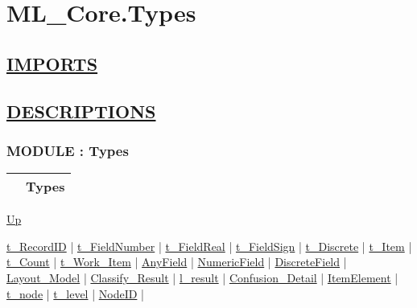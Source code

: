 \chapter*{ML\_Core.Types}
\hypertarget{ecldoc:toc:ML_Core.Types}{}

\section*{\underline{IMPORTS}}

\section*{\underline{DESCRIPTIONS}}
\subsection*{MODULE : Types}
\hypertarget{ecldoc:ML_Core.Types}{}

{\renewcommand{\arraystretch}{1.5}
\begin{tabularx}{\textwidth}{|>{\raggedright\arraybackslash}l|X|}
\hline
\hspace{0pt} & Types \\
\hline
\end{tabularx}
}

\hyperlink{ecldoc:toc:ML_Core}{Up}

\par


\hyperlink{ecldoc:ml_core.types.t_recordid}{t\_RecordID}  |
\hyperlink{ecldoc:ml_core.types.t_fieldnumber}{t\_FieldNumber}  |
\hyperlink{ecldoc:ml_core.types.t_fieldreal}{t\_FieldReal}  |
\hyperlink{ecldoc:ml_core.types.t_fieldsign}{t\_FieldSign}  |
\hyperlink{ecldoc:ml_core.types.t_discrete}{t\_Discrete}  |
\hyperlink{ecldoc:ml_core.types.t_item}{t\_Item}  |
\hyperlink{ecldoc:ml_core.types.t_count}{t\_Count}  |
\hyperlink{ecldoc:ml_core.types.t_work_item}{t\_Work\_Item}  |
\hyperlink{ecldoc:ml_core.types.anyfield}{AnyField}  |
\hyperlink{ecldoc:ml_core.types.numericfield}{NumericField}  |
\hyperlink{ecldoc:ml_core.types.discretefield}{DiscreteField}  |
\hyperlink{ecldoc:ml_core.types.layout_model}{Layout\_Model}  |
\hyperlink{ecldoc:ml_core.types.classify_result}{Classify\_Result}  |
\hyperlink{ecldoc:ml_core.types.l_result}{l\_result}  |
\hyperlink{ecldoc:ml_core.types.confusion_detail}{Confusion\_Detail}  |
\hyperlink{ecldoc:ml_core.types.itemelement}{ItemElement}  |
\hyperlink{ecldoc:ml_core.types.t_node}{t\_node}  |
\hyperlink{ecldoc:ml_core.types.t_level}{t\_level}  |
\hyperlink{ecldoc:ml_core.types.nodeid}{NodeID}  |

